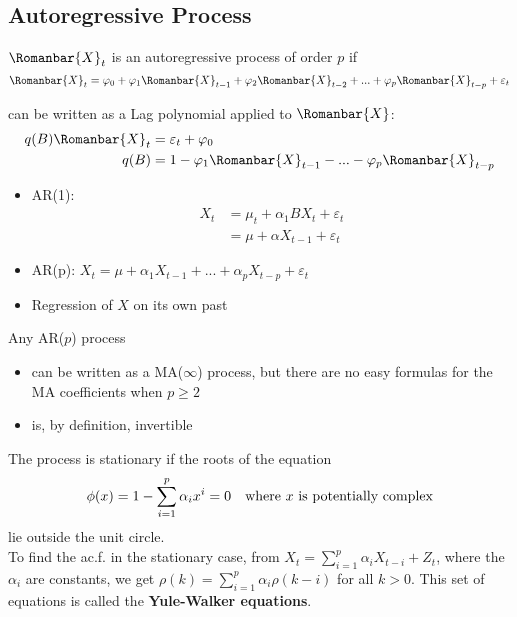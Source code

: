 \subsection{Autoregressive Process}

$\Romanbar{X}_t$ is an autoregressive process of order $p$ if 
$$\Romanbar{X}_t=\varphi_0+\varphi_1\Romanbar{X}_{t-1}+\varphi_2\Romanbar{X}_{t-2}+...+\varphi_p\Romanbar{X}_{t-p}+\varepsilon_t$$

\quad can be written as a Lag polynomial applied to $\Romanbar{X}$:
\begin{align*}
    q(B)\Romanbar{X}_t&=\varepsilon_t+\varphi_0\\
    q(B)&=1-\varphi_1\Romanbar{X}_{t-1}-...-\varphi_p\Romanbar{X}_{t-p}
\end{align*}

\begin{itemize}
    \item AR(1):
    \begin{align*}
        X_t&=\mu_t+\alpha_1 BX_t +\varepsilon_t\\
        &=\mu+\alpha X_{t-1}+\varepsilon_t
    \end{align*}
    \item AR(p): $X_t=\mu+\alpha_1 X_{t-1}+...+\alpha_pX_{t-p}+\varepsilon_t $
    \item[] Regression of $X$ on its own past
\end{itemize}

Any AR($p$) process 
\begin{itemize}
    \item can be written as a MA($\infty$) process, but there are no easy formulas for the MA coefficients when $p\geq 2$
    \item is, by definition, invertible
\end{itemize}

The process is stationary if the roots of the equation \[
\phi(x)=1-\sum_{i=1}^p \alpha_i x^{i} = 0 \text{\quad where $x$ is potentially complex}
\] lie outside the unit circle.\\

To find the ac.f. in the stationary case, from $X_t=\sum_{i=1}^p \alpha_i X_{t-i}+Z_t$, where the $\alpha_i$ are constants, we get $\rho(k)=\sum_{i=1}^p \alpha_i\rho(k-i)$ for all $k>0$. This set of equations is called the \textbf{Yule-Walker equations}.\\

